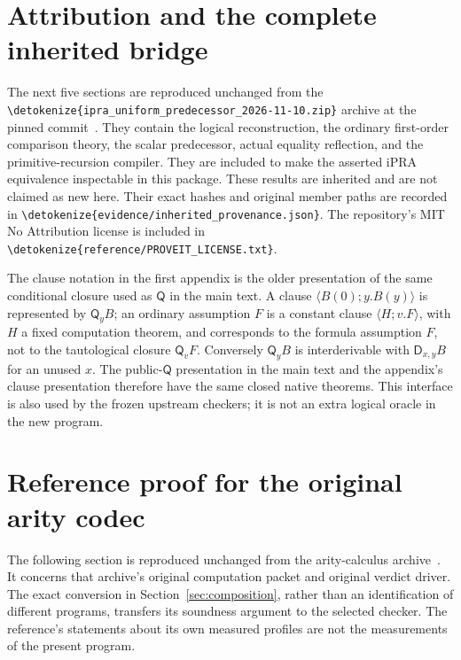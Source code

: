 \documentclass[11pt,letterpaper]{article}
\theoremstyle{definition}\newtheorem{definition}[theorem]{Definition}
\theoremstyle{remark}\newtheorem{remark}[theorem]{Remark}
\newcommand{\D}{\mathsf D}
\newcommand{\Q}{\mathsf Q}
\newcommand{\file}[1]{\expandafter\nolinkurl\expandafter{\detokenize{#1}}}
\begin{document}






\appendix
\clearpage
\section*{Attribution and the complete inherited bridge}
The next five sections are reproduced unchanged from the
\file{ipra_uniform_predecessor_2026-11-10.zip} archive at the pinned
commit~\cite{snapshot,uniform}. They contain the logical reconstruction,
the ordinary first-order comparison theory, the scalar predecessor,
actual equality reflection, and the primitive-recursion compiler.
They are included to make the asserted iPRA equivalence inspectable in
this package. These results are inherited and are not claimed as new here.
Their exact hashes and original member paths are recorded in
\file{evidence/inherited_provenance.json}. The repository's MIT No
Attribution license is included in \file{reference/PROVEIT_LICENSE.txt}.

The clause notation in the first appendix is the older presentation of
the same conditional closure used as $\Q$ in the main text. A clause
$\langle B(0);y.B(y)\rangle$ is represented by $\Q_y B$; an ordinary
assumption $F$ is a constant clause $\langle H;v.F\rangle$, with
$H$ a fixed computation theorem, and corresponds to the formula assumption
$F$, not to the tautological closure $\Q_vF$. Conversely $\Q_y B$ is interderivable
with $\D_{x,y}B$ for an unused $x$. The public-$\Q$ presentation in the
main text and the appendix's clause presentation therefore have the same
closed native theorems. This interface is also used by the frozen
upstream checkers; it is not an extra logical oracle in the new program.







\clearpage
\section*{Reference proof for the original arity codec}
The following section is reproduced unchanged from the arity-calculus
archive~\cite{arity}. It concerns that archive's original computation
packet and original verdict driver. The exact conversion in
Section~\ref{sec:composition}, rather than an identification of different
programs, transfers its soundness argument to the selected checker.
The reference's statements about its own measured profiles are not the
measurements of the present program.

\end{document}

